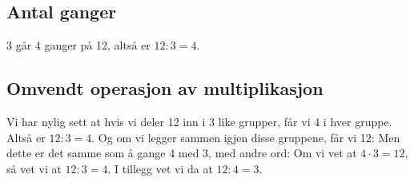 \subsection*{Antal ganger}
3 går 4 ganger på 12, altså er $ 12:3=4 $.


\subsection*{Omvendt operasjon av multiplikasjon}
Vi har nylig sett at hvis vi deler 12 inn i 3 like grupper, får vi 4 i hver gruppe. Altså er $ 12:3=4$. Og om vi legger sammen igjen disse gruppene, får vi 12: 
Men dette er det samme som å gange 4 med 3, med andre ord:
Om vi vet at $ {4\cdot 3=12} $, så vet vi at $ {12:3=4} $. I tillegg vet vi da at $ {12:4=3} $. 





